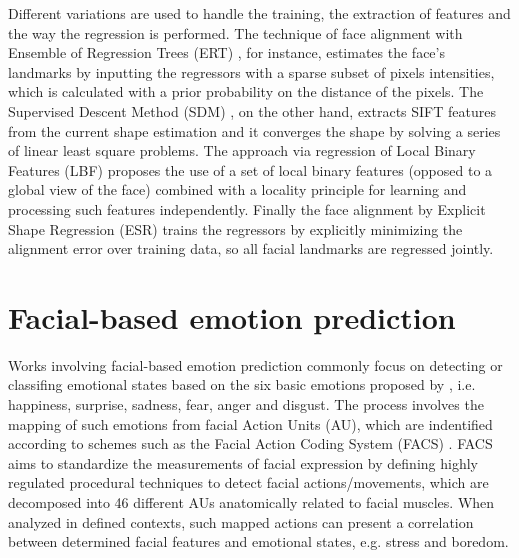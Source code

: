 Different variations are used to handle the training, the extraction of features and the way the regression is performed. The technique of face alignment with Ensemble of Regression Trees (ERT) \parencite{kazemi2014one}, for instance, estimates the face's landmarks by inputting the regressors with a sparse subset of pixels intensities, which is calculated with a prior probability on the distance of the pixels. The Supervised Descent Method (SDM) \parencite{xiong2013supervised}, on the other hand, extracts SIFT features from the current shape estimation and it converges the shape by solving a series of linear least square problems. The approach via regression of Local Binary Features (LBF) \parencite{ren2014face} proposes the use of a set of local binary features (opposed to a global view of the face) combined with a locality principle for learning and processing such features independently. Finally the face alignment by Explicit Shape Regression (ESR) \parencite{cao2014face} trains the regressors by explicitly minimizing the alignment error over training data, so all facial landmarks are regressed jointly.

\section{Facial-based emotion prediction}
\label{ch:literature-face-emotion-prediction}

Works involving facial-based emotion prediction commonly focus on detecting or classifing emotional states based on the six basic emotions proposed by \textcite{ekman1971constants}, i.e. happiness, surprise, sadness, fear, anger and disgust. The process involves the mapping of such emotions from facial Action Units (AU), which are indentified according to schemes such as the Facial Action Coding System (FACS) \parencite{ekman1977facial,cohn2007observer}. FACS aims to standardize the measurements of facial expression by defining highly regulated procedural techniques to detect facial actions/movements, which are decomposed into 46 different AUs anatomically related to facial muscles. When analyzed in defined contexts, such mapped actions can present a correlation between determined facial features and emotional states, e.g. stress and boredom.

